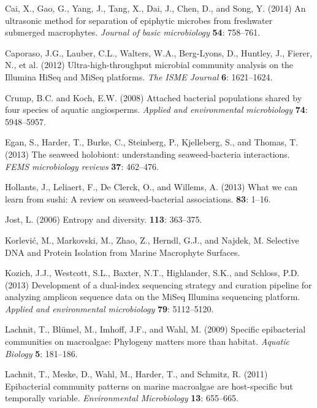 \documentclass[12pt,]{article}
\begin{document}
\leavevmode\hypertarget{ref-Cai2014}{}%
Cai, X., Gao, G., Yang, J., Tang, X., Dai, J., Chen, D., and Song, Y.
(2014) An ultrasonic method for separation of epiphytic microbes from
freshwater submerged macrophytes. \emph{Journal of basic microbiology}
\textbf{54}: 758--761.

\leavevmode\hypertarget{ref-Caporaso2012}{}%
Caporaso, J.G., Lauber, C.L., Walters, W.A., Berg-Lyons, D., Huntley,
J., Fierer, N., et al. (2012) Ultra-high-throughput microbial community
analysis on the Illumina HiSeq and MiSeq platforms. \emph{The ISME
Journal} \textbf{6}: 1621--1624.

\leavevmode\hypertarget{ref-Crump2008}{}%
Crump, B.C. and Koch, E.W. (2008) Attached bacterial populations shared
by four species of aquatic angiosperms. \emph{Applied and environmental
microbiology} \textbf{74}: 5948--5957.

\leavevmode\hypertarget{ref-Egan2013}{}%
Egan, S., Harder, T., Burke, C., Steinberg, P., Kjelleberg, S., and
Thomas, T. (2013) The seaweed holobiont: understanding seaweed-bacteria
interactions. \emph{FEMS microbiology reviews} \textbf{37}: 462--476.

\leavevmode\hypertarget{ref-Hollants2013}{}%
Hollants, J., Leliaert, F., De Clerck, O., and Willems, A. (2013) What
we can learn from sushi: A review on seaweed-bacterial associations.
\textbf{83}: 1--16.

\leavevmode\hypertarget{ref-Jost2006}{}%
Jost, L. (2006) Entropy and diversity. \textbf{113}: 363--375.

\leavevmode\hypertarget{ref-Korlevic_in_press}{}%
Korlević, M., Markovski, M., Zhao, Z., Herndl, G.J., and Najdek, M.
Selective DNA and Protein Isolation from Marine Macrophyte Surfaces.

\leavevmode\hypertarget{ref-Kozich2013}{}%
Kozich, J.J., Westcott, S.L., Baxter, N.T., Highlander, S.K., and
Schloss, P.D. (2013) Development of a dual-index sequencing strategy and
curation pipeline for analyzing amplicon sequence data on the MiSeq
Illumina sequencing platform. \emph{Applied and environmental
microbiology} \textbf{79}: 5112--5120.

\leavevmode\hypertarget{ref-Lachnit2009}{}%
Lachnit, T., Blümel, M., Imhoff, J.F., and Wahl, M. (2009) Specific
epibacterial communities on macroalgae: Phylogeny matters more than
habitat. \emph{Aquatic Biology} \textbf{5}: 181--186.

\leavevmode\hypertarget{ref-Lachnit2011}{}%
Lachnit, T., Meske, D., Wahl, M., Harder, T., and Schmitz, R. (2011)
Epibacterial community patterns on marine macroalgae are host-specific
but temporally variable. \emph{Environmental Microbiology} \textbf{13}:
655--665.
\end{document}
